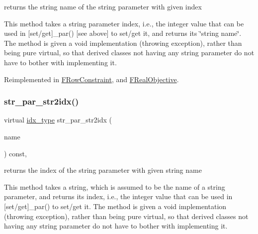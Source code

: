 returns the string name of the string parameter with given index 

This method takes a string parameter index, i.\+e., the integer value that can be used in \mbox{[}set/get\mbox{]}\+\_\+par() \mbox{[}see above\mbox{]} to set/get it, and returns its \char`\"{}string name\char`\"{}. The method is given a void implementation (throwing exception), rather than being pure virtual, so that derived classes not having any string parameter do not have to bother with implementing it. 

Reimplemented in \mbox{\hyperlink{class_s_m_spp__di__unipi__it_1_1_f_row_constraint_a216c7c4b025d1bc2e3b1a89dc2c1d46f}{F\+Row\+Constraint}}, and \mbox{\hyperlink{class_s_m_spp__di__unipi__it_1_1_f_real_objective_a216c7c4b025d1bc2e3b1a89dc2c1d46f}{F\+Real\+Objective}}.

\mbox{\label{class_s_m_spp__di__unipi__it_1_1_thin_compute_interface_ac89d3c2e4aeb331035bc878f0f9deeae}} 
\subsubsection{\texorpdfstring{str\+\_\+par\+\_\+str2idx()}{str\_par\_str2idx()}}
{\footnotesize\ttfamily virtual \mbox{\hyperlink{class_s_m_spp__di__unipi__it_1_1_thin_compute_interface_aa3d710629ad8c434286726ad810c3b47}{idx\+\_\+type}} str\+\_\+par\+\_\+str2idx (\begin{DoxyParamCaption}\item[{const std\+::string \&}]{name }\end{DoxyParamCaption}) const\hspace{0.3cm}{\ttfamily [inline]}, {\ttfamily [virtual]}}



returns the index of the string parameter with given string name 

This method takes a string, which is assumed to be the name of a string parameter, and returns its index, i.\+e., the integer value that can be used in \mbox{[}set/get\mbox{]}\+\_\+par() to set/get it. The method is given a void implementation (throwing exception), rather than being pure virtual, so that derived classes not having any string parameter do not have to bother with implementing it. 

